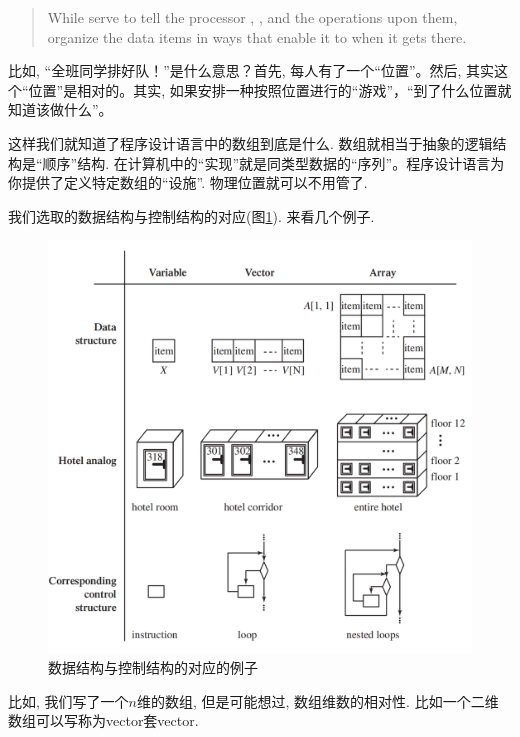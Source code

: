 \begin{quote}
	While  serve to tell the processor , , and the operations upon them, organize the data items in ways that enable it to  when it gets there.
\end{quote}

比如, “全班同学排好队！”是什么意思？首先, 每人有了一个“位置”。然后, 其实这个“位置”是相对的。其实, 如果安排一种按照位置进行的“游戏”，“到了什么位置就知道该做什么”。

这样我们就知道了程序设计语言中的数组到底是什么. 数组就相当于抽象的逻辑结构是“顺序”结构. 在计算机中的“实现”就是同类型数据的“序列”。程序设计语言为你提供了定义特定数组的“设施”. 物理位置就可以不用管了. 

我们选取的数据结构与控制结构的对应(图\ref{figs:cflow}). 来看几个例子. 

\begin{figure}
	\centering
	\includegraphics[scale=0.5]{4-programs/figs/structures}
	\caption{数据结构与控制结构的对应的例子}
	\label{figs:cflow}
	
\end{figure}

比如, 我们写了一个$n$维的数组, 但是可能想过, 数组维数的相对性. 比如一个二维数组可以写称为vector套vector. 


